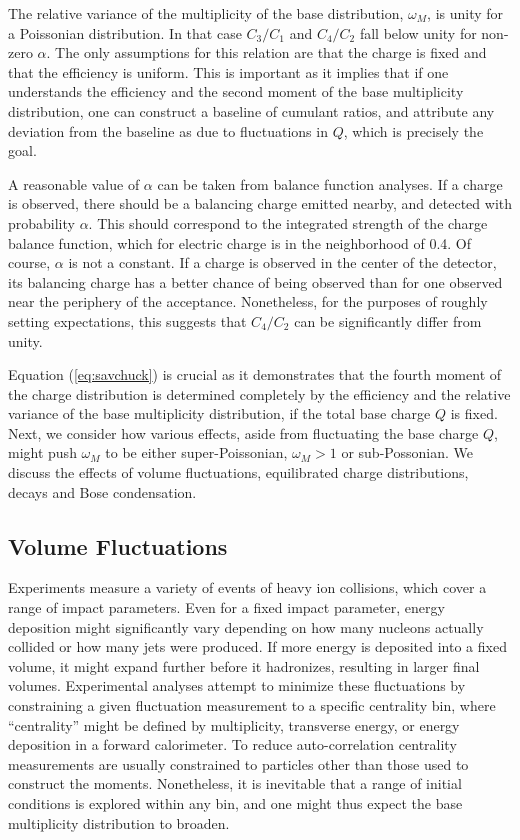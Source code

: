 \documentclass[aps,prc,nofootinbib,showpacs,superscriptaddress,groupedaddress]{revtex4-1}
\begin{document}
The relative variance of the multiplicity of the base distribution, $\omega_M$, is unity for a Poissonian distribution. In that case $C_3/C_1$ and $C_4/C_2$ fall below unity for non-zero $\alpha$. The only assumptions for this relation are that the charge is fixed and that the efficiency is uniform. This is important as it implies that if one understands the efficiency and the second moment of the base multiplicity distribution, one can construct a baseline of cumulant ratios, and attribute any deviation from the baseline as due to fluctuations in $Q$, which is precisely the goal.

A reasonable value of $\alpha$ can be taken from balance function analyses. If a charge is observed, there should be a balancing charge emitted nearby, and detected with probability $\alpha$. This should correspond to the integrated strength of the charge balance function, which for electric charge is in the neighborhood of 0.4. Of course, $\alpha$ is not a constant. If a charge is observed in the center of the detector, its balancing charge has a better chance of being observed than for one observed near the periphery of the acceptance. Nonetheless, for the purposes of roughly setting expectations, this suggests that $C_4/C_2$ can be significantly differ from unity. 

Equation (\ref{eq:savchuck}) is crucial as it demonstrates that the fourth moment of the charge distribution is determined completely by the efficiency and the relative variance of the base multiplicity distribution, if the total base charge $Q$ is fixed. Next, we consider how various effects, aside from fluctuating the base charge $Q$, might push $\omega_M$ to be either super-Poissonian, $\omega_M>1$ or sub-Possonian. We discuss the effects of volume fluctuations, equilibrated charge distributions, decays and Bose condensation.

\subsection{Volume Fluctuations}\label{sec:volumefluc}

Experiments measure a variety of events of heavy ion collisions, which cover a range of impact parameters. Even for a fixed impact parameter, energy deposition might significantly vary depending on how many nucleons actually collided or how many jets were produced. If more energy is deposited into a fixed volume, it might expand further before it hadronizes, resulting in larger final volumes. Experimental analyses attempt to minimize these fluctuations by constraining a given fluctuation measurement to a specific centrality bin, where ``centrality'' might be defined by multiplicity, transverse energy, or energy deposition in a forward calorimeter. To reduce auto-correlation centrality measurements are usually constrained to particles other than those used to construct the moments. Nonetheless, it is inevitable that a range of initial conditions is explored within any bin, and one might thus expect the base multiplicity distribution to broaden.
\end{document}
